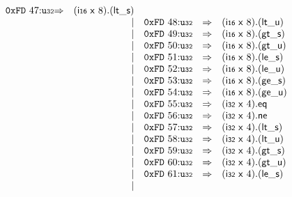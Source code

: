 $$\begin{array}{@{}l@{}rrlll@{}l@{}}
\mathtt{0xFD}~47{:}{\mathtt{u{\scriptstyle32}}} &\Rightarrow& (\mathsf{i{\scriptstyle16}}~\mathsf{x}~8) . ({\mathsf{lt\_}}{\mathsf{s}}) \\ &&|&
\mathtt{0xFD}~48{:}{\mathtt{u{\scriptstyle32}}} &\Rightarrow& (\mathsf{i{\scriptstyle16}}~\mathsf{x}~8) . ({\mathsf{lt\_}}{\mathsf{u}}) \\ &&|&
\mathtt{0xFD}~49{:}{\mathtt{u{\scriptstyle32}}} &\Rightarrow& (\mathsf{i{\scriptstyle16}}~\mathsf{x}~8) . ({\mathsf{gt\_}}{\mathsf{s}}) \\ &&|&
\mathtt{0xFD}~50{:}{\mathtt{u{\scriptstyle32}}} &\Rightarrow& (\mathsf{i{\scriptstyle16}}~\mathsf{x}~8) . ({\mathsf{gt\_}}{\mathsf{u}}) \\ &&|&
\mathtt{0xFD}~51{:}{\mathtt{u{\scriptstyle32}}} &\Rightarrow& (\mathsf{i{\scriptstyle16}}~\mathsf{x}~8) . ({\mathsf{le\_}}{\mathsf{s}}) \\ &&|&
\mathtt{0xFD}~52{:}{\mathtt{u{\scriptstyle32}}} &\Rightarrow& (\mathsf{i{\scriptstyle16}}~\mathsf{x}~8) . ({\mathsf{le\_}}{\mathsf{u}}) \\ &&|&
\mathtt{0xFD}~53{:}{\mathtt{u{\scriptstyle32}}} &\Rightarrow& (\mathsf{i{\scriptstyle16}}~\mathsf{x}~8) . ({\mathsf{ge\_}}{\mathsf{s}}) \\ &&|&
\mathtt{0xFD}~54{:}{\mathtt{u{\scriptstyle32}}} &\Rightarrow& (\mathsf{i{\scriptstyle16}}~\mathsf{x}~8) . ({\mathsf{ge\_}}{\mathsf{u}}) \\ &&|&
\mathtt{0xFD}~55{:}{\mathtt{u{\scriptstyle32}}} &\Rightarrow& (\mathsf{i{\scriptstyle32}}~\mathsf{x}~4) . \mathsf{eq} \\ &&|&
\mathtt{0xFD}~56{:}{\mathtt{u{\scriptstyle32}}} &\Rightarrow& (\mathsf{i{\scriptstyle32}}~\mathsf{x}~4) . \mathsf{ne} \\ &&|&
\mathtt{0xFD}~57{:}{\mathtt{u{\scriptstyle32}}} &\Rightarrow& (\mathsf{i{\scriptstyle32}}~\mathsf{x}~4) . ({\mathsf{lt\_}}{\mathsf{s}}) \\ &&|&
\mathtt{0xFD}~58{:}{\mathtt{u{\scriptstyle32}}} &\Rightarrow& (\mathsf{i{\scriptstyle32}}~\mathsf{x}~4) . ({\mathsf{lt\_}}{\mathsf{u}}) \\ &&|&
\mathtt{0xFD}~59{:}{\mathtt{u{\scriptstyle32}}} &\Rightarrow& (\mathsf{i{\scriptstyle32}}~\mathsf{x}~4) . ({\mathsf{gt\_}}{\mathsf{s}}) \\ &&|&
\mathtt{0xFD}~60{:}{\mathtt{u{\scriptstyle32}}} &\Rightarrow& (\mathsf{i{\scriptstyle32}}~\mathsf{x}~4) . ({\mathsf{gt\_}}{\mathsf{u}}) \\ &&|&
\mathtt{0xFD}~61{:}{\mathtt{u{\scriptstyle32}}} &\Rightarrow& (\mathsf{i{\scriptstyle32}}~\mathsf{x}~4) . ({\mathsf{le\_}}{\mathsf{s}}) \\ &&|&

\end{array}$$
